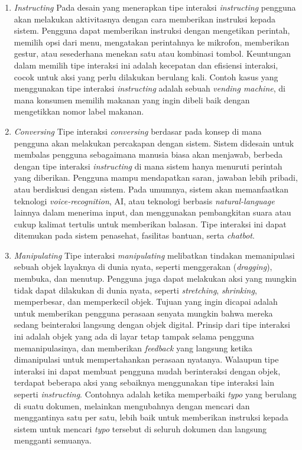 \begin{enumerate}
  \item \textit{Instructing}
  \subitem Pada desain yang menerapkan tipe interaksi \textit{instructing} pengguna akan melakukan aktivitasnya dengan cara memberikan instruksi kepada sistem. Pengguna dapat memberikan instruksi dengan mengetikan perintah, memilih opsi dari menu, mengatakan perintahnya ke mikrofon, memberikan gestur, atau sesederhana menekan satu atau kombinasi tombol. Keuntungan dalam memilih tipe interaksi ini adalah kecepatan dan efisiensi interaksi, cocok untuk aksi yang perlu dilakukan berulang kali. Contoh kasus yang menggunakan tipe interaksi \textit{instructing} adalah sebuah \textit{vending machine}, di mana konsumen memilih makanan yang ingin dibeli baik dengan mengetikkan nomor label makanan.

  \item \textit{Conversing}
  \subitem Tipe interaksi \textit{conversing} berdasar pada konsep di mana pengguna akan melakukan percakapan dengan sistem. Sistem didesain untuk membalas pengguna sebagaimana manusia biasa akan menjawab, berbeda dengan tipe interaksi \textit{instructing} di mana sistem hanya menuruti perintah yang diberikan. Pengguna mampu mendapatkan saran, jawaban lebih pribadi, atau berdiskusi dengan sistem. Pada umumnya, sistem akan memanfaatkan teknologi \textit{voice-recognition}, AI, atau teknologi berbasis \textit{natural-language} lainnya dalam menerima input, dan menggunakan pembangkitan suara atau cukup kalimat tertulis untuk memberikan balasan. Tipe interaksi ini dapat ditemukan pada sistem penasehat, fasilitas bantuan, serta \textit{chatbot}.
  
  \item \textit{Manipulating}
  \subitem Tipe interaksi \textit{manipulating} melibatkan tindakan memanipulasi sebuah objek layaknya di dunia nyata, seperti menggerakan (\textit{dragging}), membuka, dan menutup. Pengguna juga dapat melakukan aksi yang mungkin tidak dapat dilakukan di dunia nyata, seperti \textit{stretching}, \textit{shrinking}, memperbesar, dan memperkecil objek. Tujuan yang ingin dicapai adalah untuk memberikan pengguna perasaan senyata mungkin bahwa mereka sedang beinteraksi langsung dengan objek digital. Prinsip dari tipe interaksi ini adalah objek yang ada di layar tetap tampak selama pengguna memanipulasinya, dan memberikan \textit{feedback} yang langsung ketika dimanipulasi untuk mempertahankan perasaan nyatanya. Walaupun tipe interaksi ini dapat membuat pengguna mudah berinteraksi dengan objek, terdapat beberapa aksi yang sebaiknya menggunakan tipe interaksi lain seperti \textit{instructing}. Contohnya adalah ketika memperbaiki \textit{typo} yang berulang di suatu dokumen, melainkan mengubahnya dengan mencari dan menggantinya satu per satu, lebih baik untuk memberikan instruksi kepada sistem untuk mencari \textit{typo} tersebut di seluruh dokumen dan langsung mengganti semuanya.
  

\end{enumerate}
